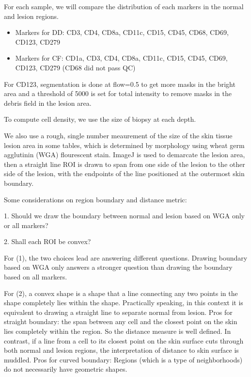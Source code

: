 \documentclass{article}
\begin{document}
\bigskip

For each sample, we will compare the distribution of each markers in the
normal and lesion regions.

\begin{itemize}
\item Markers for DD: CD3, CD4, CD8a, CD11c, CD15, CD45, CD68, CD69, CD123,
CD279

\item Markers for CF: CD1a, CD3, CD4, CD8a, CD11c, CD15, CD45, CD69, CD123,
CD279 (CD68 did not pass QC)
\end{itemize}

For CD123, segmentation is done at flow=0.5 to get more masks in the bright
area and a threshold of 5000 is set for total intensity to remove masks in
the debris field in the lesion area.

\bigskip

To compute cell density, we use the size of biopsy at each depth.

We also use a rough, single number meaurement of the size of the skin tissue
lesion area in some tables, which is determined by morphology using wheat
germ agglutinin (WGA) flourescent stain. ImageJ is used to demarcate the
lesion area, then a straight line ROI is drawn to span from one side of the
lesion to the other side of the lesion, with the endpoints of the line
positioned at the outermost skin boundary. \ \ \ \ 

\bigskip

Some considerations on region boundary and distance metric: \ 

1. Should we draw the boundary between normal and lesion based on WGA only
or all markers?

2. Shall each ROI be convex?

For (1), the two choices lead are answering different questions. Drawing
boundary based on WGA only answers a stronger question than drawing the
boundary based on all markers.

For (2), a convex shape is a shape that a line connecting any two points in
the shape completely lies within the shape. Practically speaking, in this
context it is equivalent to drawing a straight line to separate normal from
lesion. Pros for straight boundary: the span between any cell and the
closest point on the skin lies completely within the region. So the distance
measure is well defined. In contrast, if a line from a cell to its closest
point on the skin surface cuts through both normal and lesion regions, the
interpretation of distance to skin surface is muddled. Pros for curved
boundary: Regions (which is a type of neighborhoods) do not necessarily have
geometric shapes.
\end{document}
